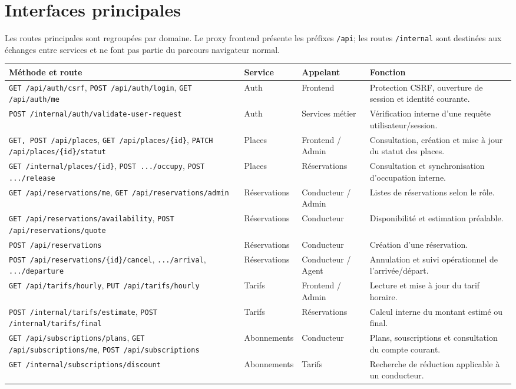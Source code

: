 \documentclass[11pt,a4paper]{report}
\begin{document}
\section{Interfaces principales}
Les routes principales sont regroupées par domaine. Le proxy frontend présente les préfixes \texttt{/api}; les routes \texttt{/internal} sont destinées aux échanges entre services et ne font pas partie du parcours navigateur normal.
\begin{longtable}{p{4.2cm}p{2.5cm}p{2.8cm}p{4.1cm}}
\toprule
\textbf{Méthode et route} & \textbf{Service} & \textbf{Appelant} & \textbf{Fonction} \\
\midrule
\texttt{GET /api/auth/csrf}, \texttt{POST /api/auth/login}, \texttt{GET /api/auth/me} & Auth & Frontend & Protection CSRF, ouverture de session et identité courante. \\
\texttt{POST /internal/auth/validate-user-request} & Auth & Services métier & Vérification interne d'une requête utilisateur/session. \\
\texttt{GET, POST /api/places}, \texttt{GET /api/places/\{id\}}, \texttt{PATCH /api/places/\{id\}/statut} & Places & Frontend / Admin & Consultation, création et mise à jour du statut des places. \\
\texttt{GET /internal/places/\{id\}}, \texttt{POST .../occupy}, \texttt{POST .../release} & Places & Réservations & Consultation et synchronisation d'occupation interne. \\
\texttt{GET /api/reservations/me}, \texttt{GET /api/reservations/admin} & Réservations & Conducteur / Admin & Listes de réservations selon le rôle. \\
\texttt{GET /api/reservations/availability}, \texttt{POST /api/reservations/quote} & Réservations & Conducteur & Disponibilité et estimation préalable. \\
\texttt{POST /api/reservations} & Réservations & Conducteur & Création d'une réservation. \\
\texttt{POST /api/reservations/\{id\}/cancel}, \texttt{.../arrival}, \texttt{.../departure} & Réservations & Conducteur / Agent & Annulation et suivi opérationnel de l'arrivée/départ. \\
\texttt{GET /api/tarifs/hourly}, \texttt{PUT /api/tarifs/hourly} & Tarifs & Frontend / Admin & Lecture et mise à jour du tarif horaire. \\
\texttt{POST /internal/tarifs/estimate}, \texttt{POST /internal/tarifs/final} & Tarifs & Réservations & Calcul interne du montant estimé ou final. \\
\texttt{GET /api/subscriptions/plans}, \texttt{GET /api/subscriptions/me}, \texttt{POST /api/subscriptions} & Abonnements & Conducteur & Plans, souscriptions et consultation du compte courant. \\
\texttt{GET /internal/subscriptions/discount} & Abonnements & Tarifs & Recherche de réduction applicable à un conducteur. \\
\bottomrule
\end{longtable}
\end{document}
